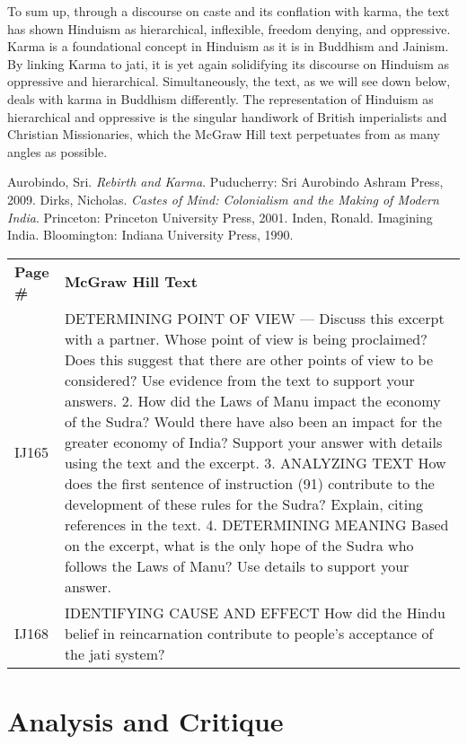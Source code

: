 To sum up, through a discourse on caste and its conflation with karma, the text has shown Hinduism as hierarchical, inflexible, freedom denying, and oppressive. Karma is a foundational concept in Hinduism as it is in Buddhism and Jainism. By linking Karma to jati, it is yet again solidifying its discourse on Hinduism as oppressive and hierarchical. Simultaneously, the text, as we will see down below, deals with karma in Buddhism differently. The representation of Hinduism as hierarchical and oppressive is the singular handiwork of British imperialists and Christian Missionaries, which the McGraw Hill text perpetuates from as many angles as possible.

\begin{thebibliography}{99}
 Aurobindo, Sri. \textit{Rebirth and Karma}. Puducherry: Sri Aurobindo Ashram Press, 2009.
 Dirks, Nicholas. \textit{Castes of Mind: Colonialism and the Making of Modern India}. Princeton: Princeton University Press, 2001.
 Inden, Ronald. Imagining India. Bloomington: Indiana University Press, 1990.
\end{thebibliography}
\newpage

\begin{longtable}{|>{\raggedleft}p{1.5cm}|p{8.5cm}|}
\multicolumn{2}{c}{\textbf{Table: 8}}\\ 
\hline
\textbf{Page \#} & \textbf{McGraw Hill Text} \tabularnewline
\hline
IJ165 & DETERMINING POINT OF VIEW — Discuss this excerpt with a partner. Whose point of view is being proclaimed? Does this suggest that there are other points of view to be considered? Use evidence from the text to support your answers. 2. How did the Laws of Manu impact the economy of the Sudra? Would there have also been an impact for the greater economy of India? Support your answer with details using the text and the excerpt. 3. ANALYZING TEXT How does the first sentence of instruction (91) contribute to the development of these rules for the Sudra? Explain, citing references in the text. 4. DETERMINING MEANING Based on the excerpt, what is the only hope of the Sudra who follows the Laws of Manu? Use details to support your answer. \tabularnewline
\hline
IJ168 & IDENTIFYING CAUSE AND EFFECT How did the Hindu belief in reincarnation contribute to people’s acceptance of the jati system? \tabularnewline
\hline
\end{longtable}

\section*{Analysis and Critique} 

